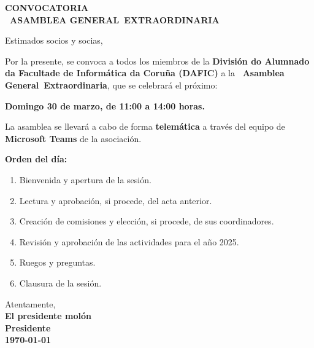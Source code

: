 \documentclass[a4paper,12pt]{article}
\newcommand{\nombreAsociacion}{División do Alumnado da Facultade de Informática da Coruña (DAFIC)}
\newcommand{\firmanteNombre}{El presidente molón} %
\newcommand{\firmanteCargo}{Presidente} %
\newcommand{\assemblyNumber}{1}
\newcommand{\assemblyName}{\Romannum{\assemblyNumber}~Asamblea General}
\newcommand{\assemblyEx}{\assemblyName~Extraordinaria}
\newcommand{\subject}{CONVOCATORIA \\ \MakeUppercase{\assemblyEx}}
\begin{document}
\begin{center}
    \large \textbf{\subject}
\end{center}

\vspace{0.5cm}

\noindent Estimados socios y socias,

\noindent Por la presente, se convoca a todos los miembros de la \textbf{\nombreAsociacion} a la \textbf{\assemblyEx}, que se celebrará el próximo:

\begin{center}
    \textbf{Domingo 30 de marzo, de 11:00 a 14:00 horas.}
\end{center}

\noindent La asamblea se llevará a cabo de forma \textbf{telemática} a través del equipo de \textbf{Microsoft Teams} de la asociación.

\vspace{0.5cm}

\noindent \textbf{Orden del día:}
\begin{enumerate}
    \item Bienvenida y apertura de la sesión.
    \item Lectura y aprobación, si procede, del acta anterior.
    \item Creación de comisiones y elección, si procede, de sus coordinadores.
    \item Revisión y aprobación de las actividades para el año 2025.
    \item Ruegos y preguntas.
    \item Clausura de la sesión.
\end{enumerate}

\vspace{1cm}
\noindent Atentamente,\\
\textbf{\firmanteNombre}\\ %
\textbf{\firmanteCargo}\\ %
\textbf{\today} %
\end{document}
